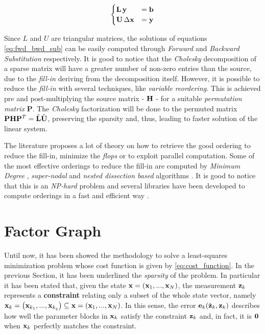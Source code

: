 \begin{equation}
    \label{eq:fwd_bwd_sub}
    \begin{cases}
        \mathbf{L}\,\mathbf{y} &= \mathbf{b} \\
        \mathbf{U}\,\Delta \mathbf{x} &= \mathbf{y}
    \end{cases}
\end{equation}

\noindent Since $L$ and $U$ are triangular matrices, the solutions of equations \ref{eq:fwd_bwd_sub} can be easily computed through \textit{Forward} and \textit{Backward Substitution} respectively. It is good to notice that the \textit{Cholesky} decomposition of a sparse matrix will have a greater number of non-zero entries than the source, due to the \textit{fill-in} deriving from the decomposition itself. However, it is possible to reduce the \textit{fill-in} with several techniques, like \textit{variable reordering}. This is achieved pre and post-multiplying the source matrix - $\mathbf{H}$ - for a suitable \textit{permutation matrix} $\mathbf{P}$. The \textit{Cholesky} factorization will be done to the permuted matrix $\mathbf{P}\mathbf{H} \mathbf{P}^T = \hat{\mathbf{L}}\hat{\mathbf{U}}$, preserving the sparsity and, thus, leading to faster solution of the linear system. 

The literature proposes a lot of theory on how to retrieve the good ordering to reduce the fill-in, minimize the \textit{flops} or to exploit parallel computation. Some of the most effective orderings to reduce the fill-in are computed by \textit{Minimum Degree} \cite{amestoy1996amd, davis2004colamd}, \textit{super-nodal} \cite{cleveland1987supernodal} and \textit{nested dissection based} algorithms \cite{karypis1998metis}. It is good to notice that this is an \textit{NP-hard} problem and several libraries have been developed to compute orderings in a fast and efficient way \cite{agarwal2012variable}.

\section{Factor Graph}\label{sec:factor_graph}
Until now, it has been showed the methodology to solve a least-squares minimization problem whose cost function is given by \ref{eq:cost_function}. In the previous Section, it has been underlined the \textit{sparsity} of the problem. In particular it has been stated that, given the state $\mathbf{x} = \left(\mathbf{x}_1, ..., \mathbf{x}_N\right)$, the measurement $\mathbf{z}_k$ represents a \textbf{constraint} relating only a subset of the whole state vector, namely $\mathbf{x}_k = \left(\mathbf{x}_{k_1}, ..., \mathbf{x}_{k_q}\right) \subseteq \mathbf{x} = \left(\mathbf{x}_1, ..., \mathbf{x}_N\right)$. In this sense, the error $\mathbf{e}_k(\hat{\mathbf{z}}_k, \mathbf{z}_k)$ describes how well the parameter blocks in $\mathbf{x}_k$ satisfy the constraint $\mathbf{z}_k$ and, in fact, it is $\mathbf{0}$ when $\mathbf{x}_k$ perfectly matches the constraint.

